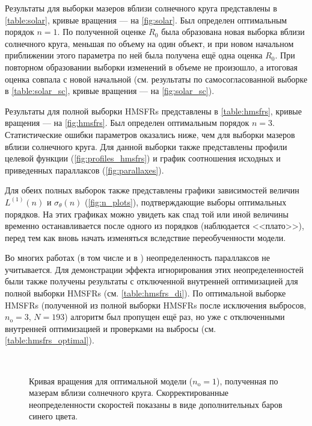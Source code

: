 \documentclass[a4paper, oneside, 14pt]{article}
\begin{document}
Результаты для выборки мазеров вблизи солнечного круга представлены в \autoref{table:solar}, кривые вращения --- на \autoref{fig:solar}. Был определен оптимальным порядок $ n = 1 $. По полученной оценке $ R_0 $ была образована новая выборка вблизи солнечного круга, меньшая по объему на один объект, и при новом начальном приближении этого параметра по ней была получена ещё одна оценка $ R_0 $. При повторном образовании выборки изменений в объеме не произошло, а итоговая оценка совпала с новой начальной (см. результаты по самосогласованной выборке в \autoref{table:solar_sc}, кривые вращения --- на \autoref{fig:solar_sc}).

Результаты для полной выборки HMSFRs представлены в \autoref{table:hmsfrs}, кривые вращения --- на \autoref{fig:hmsfrs}. Был определен оптимальным порядок $ n = 3 $. Статистические ошибки параметров оказались ниже, чем для выборки мазеров вблизи солнечного круга. Для данной выборки также представлены профили целевой функции (\autoref{fig:profiles_hmsfrs}) и график соотношения исходных и приведенных параллаксов (\autoref{fig:parallaxes}).

Для обеих полных выборок также представлены графики зависимостей величин $ L^{(1)}(n) $ и $ \sigma_\theta(n) $ (\autoref{fig:n_plots}), подтверждающие выборы оптимальных порядков. На этих графиках можно увидеть как спад той или иной величины временно останавливается после одного из порядков (наблюдается <<плато>>), перед тем как вновь начать изменяться вследствие переобученности модели.

Во многих работах (в том числе и в \cite{R.2019}) неопределенность параллаксов не учитывается. Для демонстрации эффекта игнорирования этих неопределенностей были также получены результаты с отключенной внутренней оптимизацией для полной выборки HMSFRs (см. \autoref{table:hmsfrs_di}). По оптимальной выборке HMSFRs (полученной из полной выборки HMSFRs после исключения выбросов, $ n_\text{o} = 3 $, $ N = 193 $) алгоритм был пропущен ещё раз, но уже с отключенными внутренней оптимизацией и проверками на выбросы (см. \autoref{table:hmsfrs_optimal}).

\clearpage



\begin{figure}[p!]
  \centering
  \subfloat{{\texttt{[image: Near the solar circle/n = 1/Fitted rotation curve]}}}\\
  \subfloat{{\texttt{[image: Near the solar circle/n = 1/Fitted rotation curve (errors)]}}}
  \caption{Кривая вращения для оптимальной модели ($ n_\text{o} = 1 $), полученная по мазерам вблизи солнечного круга. Скорректированные неопределенности скоростей показаны в виде дополнительных баров синего цвета.}
  \label{fig:solar}
\end{figure}
\end{document}
